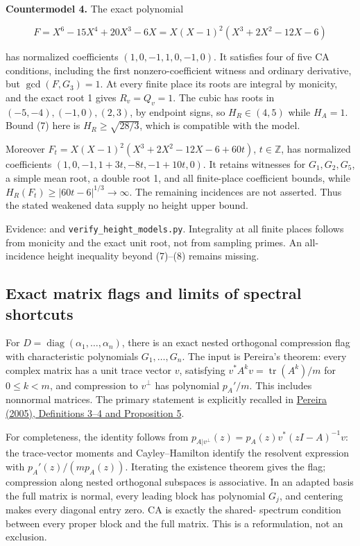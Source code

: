 \documentclass[
  british,
  10pt,
]{article}
\begin{document}
\textbf{Countermodel 4.} The exact polynomial

\[
 F=X^6-15X^4+20X^3-6X
   =X(X-1)^2(X^3+2X^2-12X-6)
\]

has normalized coefficients \((1,0,-1,1,0,-1,0)\). It satisfies four of
five CA conditions, including the first nonzero-coefficient witness and
ordinary derivative, but \(\gcd(F,G_3)=1\). At every finite place its
roots are integral by monicity, and the exact root 1 gives
\(R_v=Q_v=1\). The cubic has roots in \((-5,-4),(-1,0),(2,3)\), by
endpoint signs, so \(H_R\in(4,5)\) while \(H_A=1\). Bound (7) here is
\(H_R\ge\sqrt{28/3}\), which is compatible with the model.

Moreover \(F_t=X(X-1)^2(X^3+2X^2-12X-6+60t)\), \(t\in\mathbb Z\), has
normalized coefficients \((1,0,-1,1+3t,-8t,-1+10t,0)\). It retains
witnesses for \(G_1,G_2,G_5\), a simple mean root, a double root 1, and
all finite-place coefficient bounds, while
\(H_R(F_t)\ge|60t-6|^{1/3}\to\infty\). The remaining incidences are not
asserted. Thus the stated weakened data supply no height upper bound.

Evidence:  and
\texttt{verify\_height\_models.py}. Integrality at all finite places
follows from monicity and the exact unit root, not from sampling primes.
An all-incidence height inequality beyond (7)--(8) remains missing.

\subsection{Exact matrix flags and limits of spectral
shortcuts}\label{exact-matrix-flags-and-limits-of-spectral-shortcuts}

For \(D=\operatorname{diag}(\alpha_1,\ldots,\alpha_n)\), there is an
exact nested orthogonal compression flag with characteristic polynomials
\(G_1,\ldots,G_n\). The input is Pereira's theorem: every complex matrix
has a unit trace vector \(v\), satisfying
\(v^*A^kv=\operatorname{tr}(A^k)/m\) for \(0\le k<m\), and compression
to \(v^\perp\) has polynomial \(p_A'/m\). This includes nonnormal
matrices. The primary statement is explicitly recalled in
\href{https://www.numdam.org/item/CRMATH_2005__341_11_651_0.pdf}{Pereira
(2005), Definitions 3--4 and Proposition 5}.

For completeness, the identity follows from
\(p_{A|v^\perp}(z)=p_A(z)v^*(zI-A)^{-1}v\): the trace-vector moments and
Cayley--Hamilton identify the resolvent expression with
\(p_A'(z)/(mp_A(z))\). Iterating the existence theorem gives the flag;
compression along nested orthogonal subspaces is associative. In an
adapted basis the full matrix is normal, every leading block has
polynomial \(G_j\), and centering makes every diagonal entry zero. CA is
exactly the shared- spectrum condition between every proper block and
the full matrix. This is a reformulation, not an exclusion.
\end{document}
